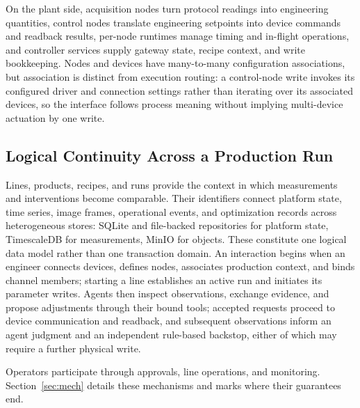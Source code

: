 On the plant side, acquisition nodes turn protocol readings into engineering
quantities, control nodes translate engineering setpoints into device commands and
readback results, per-node runtimes manage timing and in-flight operations, and
controller services supply gateway state, recipe context, and write bookkeeping.
Nodes and devices have many-to-many configuration associations, but association is
distinct from execution routing: a control-node write invokes its configured driver
and connection settings rather than iterating over its associated devices, so the
interface follows process meaning without implying multi-device actuation by one
write.

\subsection{Logical Continuity Across a Production Run}
Lines, products, recipes, and runs provide the context in which measurements and
interventions become comparable. Their identifiers connect platform state, time
series, image frames, operational events, and optimization records across
heterogeneous stores: SQLite and file-backed repositories for platform state,
TimescaleDB for measurements, MinIO for objects. These constitute one logical data
model rather than one transaction domain. An interaction begins when an engineer
connects devices, defines nodes, associates production context, and binds channel
members; starting a line establishes an active run and initiates its parameter
writes. Agents then inspect observations, exchange evidence, and propose adjustments
through their bound tools; accepted requests proceed to device communication and
readback, and subsequent observations inform an agent judgment and an
independent rule-based backstop, either of which may require a further physical
write.

Operators participate through approvals, line operations, and monitoring.
Section~\ref{sec:mech} details these mechanisms and marks where their guarantees
end.
